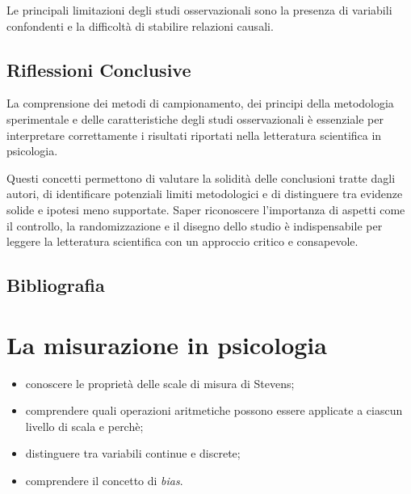 \documentclass[
  letterpaper,
]{krantz}
\providecommand{\tightlist}{%
  \setlength{\itemsep}{0pt}\setlength{\parskip}{0pt}}\usepackage{longtable,booktabs,array}
\begin{document}
Le principali limitazioni degli studi osservazionali sono la presenza di
variabili confondenti e la difficoltà di stabilire relazioni causali.

\section{Riflessioni Conclusive}\label{riflessioni-conclusive-1}

La comprensione dei metodi di campionamento, dei principi della
metodologia sperimentale e delle caratteristiche degli studi
osservazionali è essenziale per interpretare correttamente i risultati
riportati nella letteratura scientifica in psicologia.

Questi concetti permettono di valutare la solidità delle conclusioni
tratte dagli autori, di identificare potenziali limiti metodologici e di
distinguere tra evidenze solide e ipotesi meno supportate. Saper
riconoscere l'importanza di aspetti come il controllo, la
randomizzazione e il disegno dello studio è indispensabile per leggere
la letteratura scientifica con un approccio critico e consapevole.

\section*{Bibliografia}\label{bibliografia-2}


\chapter{La misurazione in psicologia}\label{sec-measurement}

\begin{tcolorbox}[enhanced jigsaw, toprule=.15mm, breakable, bottomrule=.15mm, colback=white, colbacktitle=quarto-callout-important-color!10!white, left=2mm, toptitle=1mm, colframe=quarto-callout-important-color-frame, coltitle=black, opacitybacktitle=0.6, bottomtitle=1mm, titlerule=0mm, leftrule=.75mm, opacityback=0, rightrule=.15mm, title=\textcolor{quarto-callout-important-color}{\faExclamation}\hspace{0.5em}{In questo capitolo imparerai a}, arc=.35mm]

\begin{itemize}
\tightlist
\item
  conoscere le proprietà delle scale di misura di Stevens;
\item
  comprendere quali operazioni aritmetiche possono essere applicate a
  ciascun livello di scala e perchè;
\item
  distinguere tra variabili continue e discrete;
\item
  comprendere il concetto di \emph{bias}.
\end{itemize}

\end{tcolorbox}
\end{document}
